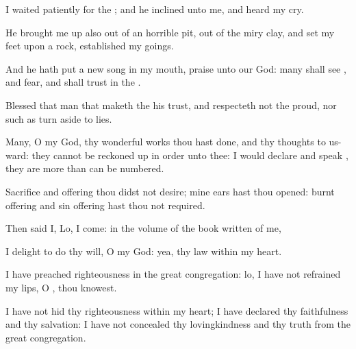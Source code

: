 {\Q {}I
waited
patiently for the
{}; and he
inclined unto me, and
heard my
cry.


\par }{\Q {}He brought me
up also out of an
horrible
pit, out of the
miry
clay, and
set my
feet upon a
rock,
{}
established my
goings.


\par }{\Q {}And he hath
put a
new
song in my
mouth,
{}
praise unto our
God:
many shall
see
{}, and
fear, and shall
trust in the
{}.


\par }{\Q {}Blessed
{} that
man that
maketh the
{} his
trust, and
respecteth not the
proud, nor such as turn
aside to
lies.


\par }{\Q {}Many, O
{} my
God,
{} thy
wonderful works
{} thou hast
done, and thy
thoughts
{} to us-ward: they cannot be reckoned up in
order unto thee:
{} I would
declare and
speak
{}, they are
more than can be
numbered.


\par }{\BB \par }
{\Q {}Sacrifice and
offering thou didst not
desire; mine
ears hast thou
opened: burnt
offering and sin
offering hast thou not
required.


\par }{\Q {}Then
said I, Lo, I
come: in the
volume of the
book
{}
written of me,


\par }{\Q {}I
delight to
do thy
will, O my
God: yea, thy
law
{}
within my
heart.


\par }{\Q {}I have
preached
righteousness in the
great
congregation: lo, I have not
refrained my
lips, O
{}, thou
knowest.


\par }{\Q {}I have not
hid thy
righteousness
within my
heart; I have
declared thy
faithfulness and thy
salvation: I have not
concealed thy
lovingkindness and thy
truth from the
great
congregation.


\par }{\BB \par }
